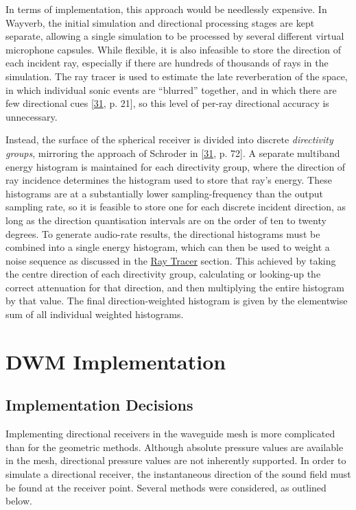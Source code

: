 \documentclass[]{scrreprt}
\begin{document}
In terms of implementation, this approach would be needlessly expensive.
In Wayverb, the initial simulation and directional processing stages are
kept separate, allowing a single simulation to be processed by several
different virtual microphone capsules. While flexible, it is also
infeasible to store the direction of each incident ray, especially if
there are hundreds of thousands of rays in the simulation. The ray
tracer is used to estimate the late reverberation of the space, in which
individual sonic events are ``blurred'' together, and in which there are
few directional cues
{[}\protect\hyperlink{ref-schroderux5fphysicallyux5f2011}{31}, p. 21{]},
so this level of per-ray directional accuracy is unnecessary.

Instead, the surface of the spherical receiver is divided into discrete
\emph{directivity groups}, mirroring the approach of Schroder in
{[}\protect\hyperlink{ref-schroderux5fphysicallyux5f2011}{31}, p. 72{]}.
A separate multiband energy histogram is maintained for each directivity
group, where the direction of ray incidence determines the histogram
used to store that ray's energy. These histograms are at a substantially
lower sampling-frequency than the output sampling rate, so it is
feasible to store one for each discrete incident direction, as long as
the direction quantisation intervals are on the order of ten to twenty
degrees. To generate audio-rate results, the directional histograms must
be combined into a single energy histogram, which can then be used to
weight a noise sequence as discussed in the
\href{\%7B\%7B\%20site.baseurl\%20\%7D\%7D\%7B\%\%20link\%20ray_tracer.md\%20\%\%7D\%7D}{Ray
Tracer} section. This achieved by taking the centre direction of each
directivity group, calculating or looking-up the correct attenuation for
that direction, and then multiplying the entire histogram by that value.
The final direction-weighted histogram is given by the elementwise sum
of all individual weighted histograms.

\section{DWM Implementation}\label{dwm-implementation}

\subsection{Implementation Decisions}\label{implementation-decisions}

Implementing directional receivers in the waveguide mesh is more
complicated than for the geometric methods. Although absolute pressure
values are available in the mesh, directional pressure values are not
inherently supported. In order to simulate a directional receiver, the
instantaneous direction of the sound field must be found at the receiver
point. Several methods were considered, as outlined below.
\end{document}
